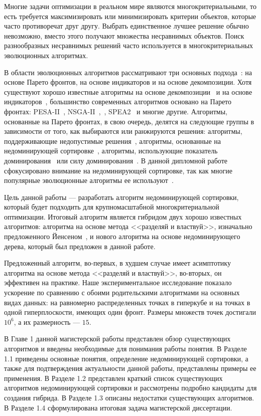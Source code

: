 \startprefacepage

Многие задачи оптимизации в реальном мире являются многокритериальными, то есть требуется максимизировать или минимизировать критерии объектов, которые часто противоречат друг другу. Выбрать единственное лучшее решение обычно невозможно, вместо этого получают множества несравнимых объектов. Поиск разнообразных несравнимых решений часто используется в многокритериальных эволюционных алгоритмах.

В области эволюционных алгоритмов рассматривают три основных подхода~\cite{Brockhoff}: на основе Парето фронтов, на основе индикаторов и на основе декомпозиции. Хотя существуют хорошо известные алгоритмы на основе декомпозиции~\cite{Zhang2007} и на основе индикаторов~\cite{Zitzler}, большинство современных алгоритмов основано на Парето фронтах: PESA-II~\cite{PESA-II}, NSGA-II~\cite{NSGA-II},~\cite{Deb2013}, SPEA2~\cite{SPEA2} и многие другие. Алгоритмы, основанные на Парето фронтах, в свою очередь, делятся на следующие группы в зависимости от того, как выбираются или ранжируются решения: алгоритмы, поддерживающие недопустимые решения~\cite{Coello, PESA-II, PAES}, алгоритмы, основанные на недоминирующей сортировке~\cite{NSGA-II, Deb2013}, алгоритмы, использующие показатель доминирования~\cite{Fonseca} или силу доминирования~\cite{SPEA2}. В данной дипломной работе сфокусировано внимание на недоминирующей сортировке, так как многие популярные эволюционные алгоритмы ее используют~\cite{NSGA-II, Deb2013}.

Цель данной работы {---} разработать алгоритм недоминирующей сортировки, который будет подходить для крупномасштабной многокритериальной оптимизации. Итоговый алгоритм является гибридом двух хорошо известных алгоритмов: алгоритма на основе метода <<разделяй и властвуй>>, изначально предложенного Йенсеном~\cite{Jensen}, и нового алгоритма на основе недоминирующего дерева, который был предложен в данной работе.

Предложенный алгоритм, во-первых, в худшем случае имеет асимптотику алгоритма на основе метода <<разделяй и властвуй>>, во-вторых, он эффективен на практике. Наше экспериментальное исследование показало ускорение по сравнению с обоими родительскими алгоритмами на основных видах данных: на равномерно распределенных точках в гиперкубе и на точках в одной гиперплоскости, имеющих один фронт. Размеры множеств точек достигали $10^6$, а их размерность {---} $15$.

В Главе 1 данной магистерской работы представлен обзор существующих алгоритмов и введены необходимые для понимания работы понятия. 
В Разделе 1.1 приведены основные понятия, определение недоминирующей сортировки, а также для подтверждения актуальности данной работы, представлены примеры ее применения. 
В Разделе 1.2 представлен краткий список существующих алгоритмов недоминирующей сортировки и рассмотрены подробно кандидаты для создания гибрида. 
В Разделе 1.3 описаны недостатки существующих алгоритмов. 
В Разделе 1.4 сформулирована итоговая задача магистерской диссертации.

